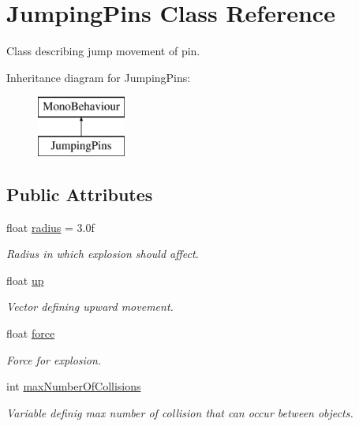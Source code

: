 \hypertarget{class_jumping_pins}{}\section{Jumping\+Pins Class Reference}
\label{class_jumping_pins}


Class describing jump movement of pin.  


Inheritance diagram for Jumping\+Pins\+:\begin{figure}[H]
\begin{center}
\leavevmode
\includegraphics[height=2.000000cm]{class_jumping_pins}
\end{center}
\end{figure}
\subsection*{Public Attributes}
\begin{DoxyCompactItemize}
\item 
float \hyperlink{class_jumping_pins_ae0c8d6f8c73c3efbdaf4e6fbf9a9299d}{radius} = 3.\+0f
\begin{DoxyCompactList}\small\item\em Radius in which explosion should affect. \end{DoxyCompactList}\item 
float \hyperlink{class_jumping_pins_a16bacff923dbd14b883bb6ec3262b78e}{up}
\begin{DoxyCompactList}\small\item\em Vector defining upward movement. \end{DoxyCompactList}\item 
float \hyperlink{class_jumping_pins_af7d195dc1a8351eb4a6f08bd77032e74}{force}
\begin{DoxyCompactList}\small\item\em Force for explosion. \end{DoxyCompactList}\item 
int \hyperlink{class_jumping_pins_a31a3fe87e85993182f3ed08538bf85cf}{max\+Number\+Of\+Collisions}
\begin{DoxyCompactList}\small\item\em Variable definig max number of collision that can occur between objects. \end{DoxyCompactList}\end{DoxyCompactItemize}


